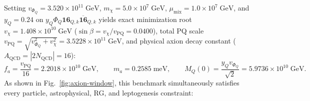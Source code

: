 \documentclass[11pt,a4paper]{article}
\begin{document}
Setting $v_{\Phi_Q} = 3.520\times 10^{11}\;\mathrm{GeV}$, $m_\chi = 5.0\times 10^7\;\mathrm{GeV}$, $\mu_{\mathrm{mix}} = 1.0\times 10^7\;\mathrm{GeV}$, and $y_Q = 0.24$ on $y_Q\Phi_Q\mathbf{16}_{Q,k}\overline{\mathbf{16}}_{Q,k}$ yields exact minimization root $v_\chi = 1.408\times 10^{10}\;\mathrm{GeV}$ ($\sin\beta = v_\chi/v_{\mathrm{PQ}} = 0.0400$), total PQ scale $v_{\mathrm{PQ}} = \sqrt{v_{\Phi_Q}^2 + v_\chi^2} = 3.5228\times 10^{11}\;\mathrm{GeV}$, and physical axion decay constant ($A_{\mathrm{QCD}} = |2 N_{\mathrm{QCD}}| = 16$):
\begin{equation}
f_a = \frac{v_{\mathrm{PQ}}}{16} = 2.2018\times 10^{10}\;\mathrm{GeV}, \qquad m_a = 0.2585\;\mathrm{meV}, \qquad M_Q(0) = \frac{y_Q v_{\Phi_Q}}{\sqrt{2}} = 5.9736\times 10^{10}\;\mathrm{GeV}.
\label{eq:A1-scales}
\end{equation}
As shown in Fig.~\ref{fig:axion-window}, this benchmark simultaneously satisfies every particle, astrophysical, RG, and leptogenesis constraint:
\end{document}
